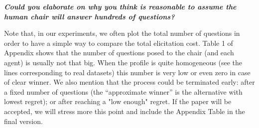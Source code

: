 \documentclass{article}
\begin{document}
\textit{\textbf{Could you elaborate on why you think is reasonable to assume the human chair will answer hundreds of questions?}}

Note that, in our experiments, we often plot the total number of questions in order to have a simple way to compare the total elicitation cost. Table 1 of Appendix shows that the number of questions posed to the chair (and each agent) is usually not that big. When the profile is quite homogeneous (see the lines corresponding to real datasets) this number is very low or even zero in case of clear winner. We also mention that the process could be terminated early: after a fixed number of questions (the “approximate winner” is the alternative with lowest regret); or after reaching a "low enough" regret.
If the paper will be accepted, we will stress more this point and include the Appendix Table in the final version.
\end{document}
